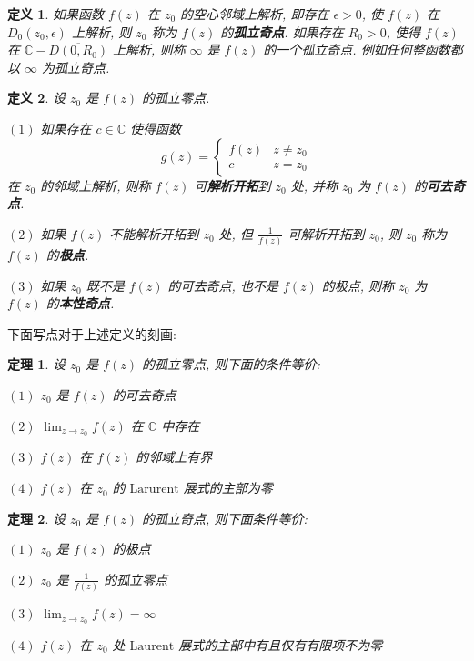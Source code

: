 \documentclass[12pt,a4paper]{article}
\newtheorem{thm}{定理}[section]  %
\newtheorem{definition}{定义}[section] %
\begin{document}
\begin{definition}
    如果函数 $f(z)$ 在 $z_0$ 的空心邻域上解析, 即存在 $\epsilon > 0$, 使 $f(z)$ 在 $D_0(z_0, \epsilon)$ 上解析, 则 $z_0$ 称为 $f(z)$ 的\textbf{孤立奇点}. 
    如果存在 $R_0>0$, 使得 $f(z)$ 在 $\mathbb{C} - \overline{D(0, R_0)}$ 上解析, 则称 $\infty$ 是 $f(z)$ 的一个孤立奇点. 例如任何整函数都以 $\infty$ 为孤立奇点.
\end{definition}

\begin{definition}
    设 $z_0$ 是 $f(z)$ 的孤立零点.
    
    $(1)$ 如果存在 $c \in \mathbb{C}$ 使得函数 \[g(z) = \begin{cases}f(z) & z \neq z_0 \\ c & z = z_0 \end{cases}\] 
    在 $z_0$ 的邻域上解析, 则称 $f(z)$ 可\textbf{解析开拓}到 $z_0$ 处, 并称 $z_0$ 为 $f(z)$ 的\textbf{可去奇点}.

    $(2)$ 如果 $f(z)$ 不能解析开拓到 $z_0$ 处, 但 $\frac{1}{f(z)}$ 可解析开拓到 $z_0$, 则 $z_0$ 称为 $f(z)$ 的\textbf{极点}.

    $(3)$ 如果 $z_0$ 既不是 $f(z)$ 的可去奇点, 也不是 $f(z)$ 的极点, 则称 $z_0$ 为 $f(z)$ 的\textbf{本性奇点}.
\end{definition}

下面写点对于上述定义的刻画:

\begin{thm}
    设 $z_0$ 是 $f(z)$ 的孤立零点, 则下面的条件等价:

    $(1)$ $z_0$ 是 $f(z)$ 的可去奇点

    $(2)$ $\lim_{z \to z_0} f(z)$ 在 $\mathbb{C}$ 中存在

    $(3)$ $f(z)$ 在 $f(z)$ 的邻域上有界

    $(4)$ $f(z)$ 在 $z_0$ 的 $\mathrm{Larurent}$ 展式的主部为零
\end{thm}

\begin{thm}
    设 $z_0$ 是 $f(z)$ 的孤立奇点, 则下面条件等价:

    $(1)$ $z_0$ 是 $f(z)$ 的极点

    $(2)$ $z_0$ 是 $\frac{1}{f(z)}$ 的孤立零点

    $(3)$ $\lim_{z \to z_0} f(z) = \infty$

    $(4)$ $f(z)$ 在 $z_0$ 处 $\mathrm{Laurent}$ 展式的主部中有且仅有有限项不为零
\end{thm}
\end{document}
